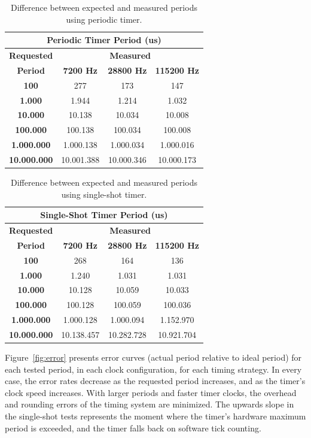 \documentclass[final,3pd,times]{elsarticle}
\begin{document}
\begin{table}[ht]
\centering
\scriptsize{
\begin{tabular}{c|c|c|c}
\multicolumn{4}{c}{\textbf{Periodic Timer Period (us)}} \\
\hline
\textbf{Requested}	& \multicolumn{3}{c}{\textbf{Measured}} \\
\cline{2-4}
\textbf{Period}	& \textbf{7200 Hz}	& \textbf{28800 Hz} 	& \textbf{115200 Hz} \\
\hline
\textbf{100}		& 277		& 173		& 147		\\
\textbf{1.000}		& 1.944		& 1.214		& 1.032		\\
\textbf{10.000}		& 10.138	& 10.034	& 10.008	\\
\textbf{100.000}	& 100.138	& 100.034	& 100.008	\\
\textbf{1.000.000}	& 1.000.138	& 1.000.034	& 1.000.016	\\
\textbf{10.000.000}	& 10.001.388	& 10.000.346	& 10.000.173	\\
\end{tabular}
}
\caption{Difference between expected and measured periods using periodic timer.}
\label{tab:error_periodic}
\end{table}

\begin{table}[ht]
\centering
\scriptsize{
\begin{tabular}{c|c|c|c}
\multicolumn{4}{c}{\textbf{Single-Shot Timer Period (us)}} \\
\hline
\textbf{Requested}	& \multicolumn{3}{c}{\textbf{Measured}} \\
\cline{2-4}
\textbf{Period}	& \textbf{7200 Hz}	& \textbf{28800 Hz} 	& \textbf{115200 Hz} \\
\hline
\textbf{100}		& 268		& 164		& 136		\\
\textbf{1.000}		& 1.240		& 1.031		& 1.031		\\
\textbf{10.000}		& 10.128	& 10.059	& 10.033	\\
\textbf{100.000}	& 100.128	& 100.059	& 100.036	\\
\textbf{1.000.000}	& 1.000.128	& 1.000.094	& 1.152.970	\\
\textbf{10.000.000}	& 10.138.457	& 10.282.728	& 10.921.704	\\
\end{tabular}
}
\caption{Difference between expected and measured periods using single-shot timer.}
\label{tab:error_single-shot}
\end{table}

Figure~\ref{fig:error} presents error curves (actual period relative to
ideal period) for each tested period, in each clock configuration, for
each timing strategy. In every case, the error rates decrease as the
requested period increases, and as the timer's clock speed increases.
With larger periods and faster timer clocks, the overhead and rounding
errors of the timing system are minimized. The upwards slope in the
single-shot tests represents the moment where the timer's hardware
maximum period is exceeded, and the timer falls back on software tick
counting.
\end{document}

